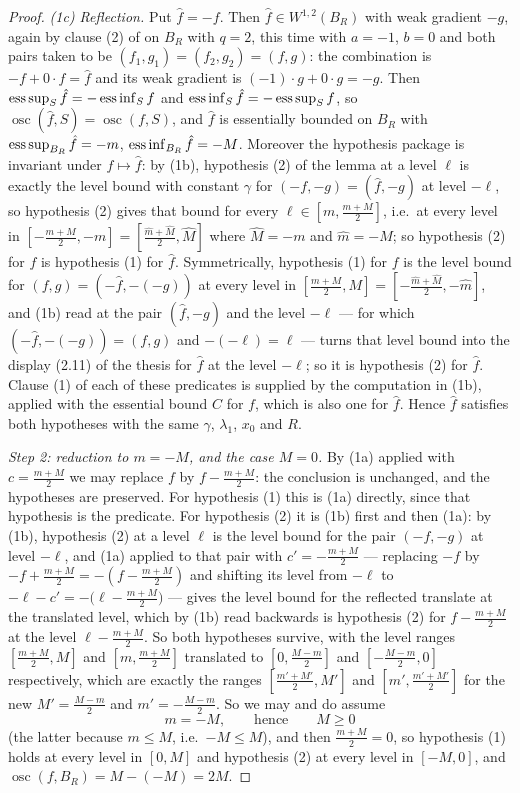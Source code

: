 \begin{proof}
\emph{(1c) Reflection.}  Put $\hat f=-f$.  Then $\hat f\in W^{1,2}(B_R)$ with weak
gradient $-g$, again by clause (2) of  on $B_R$ with
$q=2$, this time with $a=-1$, $b=0$ and both pairs taken to be
$(f_1,g_1)=(f_2,g_2)=(f,g)$: the combination is $-f+0\cdot f=\hat f$ and its weak
gradient is $(-1)\cdot g+0\cdot g=-g$.  Then
$\operatorname*{ess\,sup}_S\hat f=-\operatorname*{ess\,inf}_Sf$ and $\operatorname*{ess\,inf}_S\hat f=-\operatorname*{ess\,sup}_Sf$, so
$\operatorname*{osc}(\hat f,S)=\operatorname*{osc}(f,S)$, and $\hat f$ is
essentially bounded on $B_R$ with $\operatorname*{ess\,sup}_{B_R}\hat f=-m$,
$\operatorname*{ess\,inf}_{B_R}\hat f=-M$.  Moreover the hypothesis package is invariant under
$f\mapsto\hat f$: by (1b), hypothesis (2) of the lemma at a level $\ell$ is
exactly the level bound with constant $\gamma$ for
$(-f,-g)=(\hat f,-g)$ at level $-\ell$, so hypothesis (2) gives that bound for
every $\ell\in[m,\frac{m+M}2]$, i.e.\ at every level in
$[-\frac{m+M}2,-m]=[\frac{\hat m+\hat M}2,\hat M]$ where $\hat M=-m$ and
$\hat m=-M$; so hypothesis (2) for $f$ is hypothesis (1) for $\hat f$.
Symmetrically, hypothesis (1) for $f$ is the level bound for $(f,g)=
(-\hat f,-(-g))$ at every level in $[\frac{m+M}2,M]=[-\frac{\hat m+\hat M}2,-\hat m]$,
and (1b) read at the pair $(\hat f,-g)$ and the level $-\ell$ --- for which
$(-\hat f,-(-g))=(f,g)$ and $-(-\ell)=\ell$ --- turns that level bound into the
display (2.11) of the thesis for $\hat f$ at the level $-\ell$; so it is hypothesis
(2) for $\hat f$.  Clause (1) of each of these predicates is supplied by the
computation in (1b), applied with the essential bound $C$ for $f$, which is also
one for $\hat f$.  Hence $\hat f$ satisfies both
hypotheses with the same $\gamma$, $\lambda_1$, $x_0$ and $R$.

\emph{Step 2: reduction to $m=-M$, and the case $M=0$.}  By (1a) applied with
$c=\frac{m+M}2$ we may replace $f$ by $f-\frac{m+M}2$: the conclusion is
unchanged, and the hypotheses are preserved.  For hypothesis (1) this is (1a)
directly, since that hypothesis is the predicate.  For hypothesis (2) it is
(1b) first and then (1a): by (1b), hypothesis (2) at a level $\ell$ is the level
bound for the pair $(-f,-g)$ at level $-\ell$, and (1a) applied to that pair with
$c'=-\frac{m+M}2$ --- replacing $-f$ by $-f+\frac{m+M}2=-(f-\frac{m+M}2)$ and
shifting its level from $-\ell$ to $-\ell-c'=-\bigl(\ell-\frac{m+M}2\bigr)$ ---
gives the level bound for the reflected translate at the translated level, which
by (1b) read backwards is hypothesis (2) for $f-\frac{m+M}2$ at the level
$\ell-\frac{m+M}2$.  So both hypotheses survive, with the level ranges
$[\frac{m+M}2,M]$ and $[m,\frac{m+M}2]$ translated to
$[0,\frac{M-m}2]$ and $[-\frac{M-m}2,0]$ respectively, which are exactly the
ranges $[\frac{m'+M'}2,M']$ and $[m',\frac{m'+M'}2]$ for the new
$M'=\frac{M-m}2$ and $m'=-\frac{M-m}2$.  So we may and do assume
\[
m=-M,\qquad\text{hence}\qquad M\ge0
\]
(the latter because $m\le M$, i.e.\ $-M\le M$), and then
$\frac{m+M}2=0$, so hypothesis (1) holds at every level in $[0,M]$ and
hypothesis (2) at every level in $[-M,0]$, and
$\operatorname*{osc}(f,B_R)=M-(-M)=2M$.


\end{proof}
